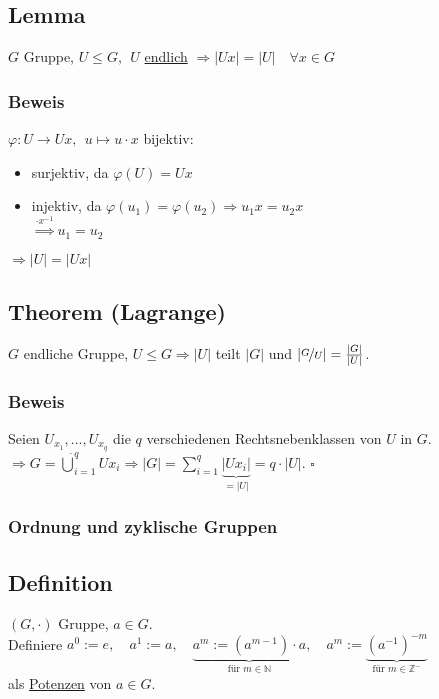 \documentclass[12pt,titlepage, pdf]{article}
\newcommand{\f}[2]{\nicefrac{#1}{#2}}
\newcommand{\uline}[1]{\underline{#1}}
\renewcommand{\>}{\rightarrow}
\renewcommand{\*}{\cdot}
\renewcommand{\phi}{\varphi}
\begin{document}
	      \subsection{Lemma}
	      $G$ Gruppe, $U \leq G,~~ U$ \uline{endlich} $\Rightarrow |Ux| = |U|\quad \forall x \in G$
	      \subsubsection*{Beweis}
	      $\phi: U \rightarrow Ux,~~ u \mapsto u \cdot x$ bijektiv:
	      \begin{itemize}
	      	\item surjektiv, da $\phi(U) = Ux$
	      	\item injektiv, da $\phi(u_1) = \phi(u_2) \Rightarrow u_1x = u_2x$\\
	      	      \noindent\hspace*{44.5mm}$\overset{\cdot x^{-1}}{\Rightarrow} u_1 = u_2$
	      \end{itemize}
	      $ \Rightarrow |U| = |Ux|$
	      \subsection{Theorem (Lagrange)}
	      $G$ endliche Gruppe, $U \leq G \Rightarrow |U|$ teilt $|G|$ und $| \f{G}{U} | = \frac{|G|}{|U|}$.
	      \subsubsection*{Beweis} Seien $U_{x_1},..., U_{x_q}$ die $q$ verschiedenen Rechtsnebenklassen von $U$ in $G$. \\
	      $\Rightarrow G = \dot{\bigcup}^q_{i=1} Ux_i \Rightarrow |G| =  \sum_{i = 1}^{q}  \underbrace{|Ux_i|}_{=|U|} = q \cdot |U|.$
	      \hfill$\square$
	      \subsubsection*{Ordnung und zyklische Gruppen}
	      \subsection{Definition}
	      $(G, \cdot )$ Gruppe, $a \in G$.\\ Definiere $a^0 := e,\quad a^1 := a,\quad \underbrace{a^m := (a^{m-1}) \cdot a}_{\textrm{für }m \in \mathds{N}},\quad a^m := \underbrace{ (a^{-1})^{-m}}_{\textrm{für }m \in \mathds{Z}^-}$\\
	      als \uline{Potenzen} von $a \in G$.
\end{document}
